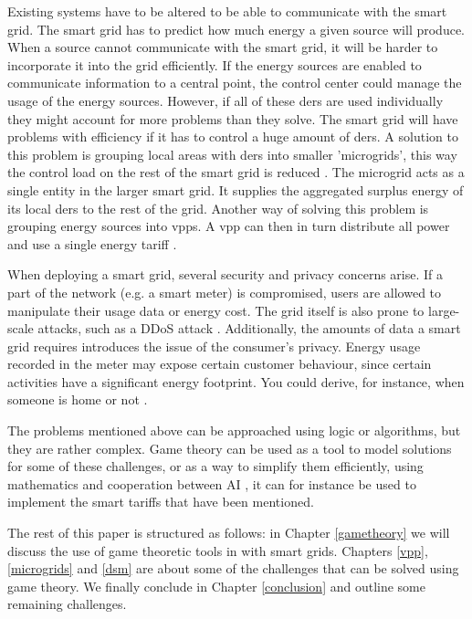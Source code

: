 Existing systems have to be altered to be able to communicate with the smart grid. The smart grid has to predict how much energy a given source will produce. When a source cannot communicate with the smart grid, it will be harder to incorporate it into the grid efficiently. If the energy sources are enabled to communicate information to a central point, the control center could manage the usage of the energy sources. However, if all of these \acp{der} are used individually they might account for more problems than they solve. The smart grid will have problems with efficiency if it has to control a huge amount of \acp{der}. A solution to this problem is grouping local areas with \acp{der} into smaller 'microgrids', this way the control load on the rest of the smart grid is reduced \cite{HatziargyriouAsanoIravaniMarnay2007}. The microgrid acts as a single entity in the larger smart grid. It supplies the aggregated surplus energy of its local \acp{der} to the rest of the grid. Another way of solving this problem is grouping energy sources into \acp{vpp}. A \ac{vpp} can then in turn distribute all power and use a single energy tariff \cite{NikonowiczMilewski2012}.

When deploying a smart grid, several security and privacy concerns arise.  If a part of the network (e.g. a smart meter) is compromised, users are allowed to manipulate their usage data or energy cost. The grid itself is also prone to large-scale attacks, such as a DDoS attack \cite{McDanielMcLaughlin2009a}. Additionally, the amounts of data a smart grid requires introduces the issue of the consumer's privacy. Energy usage recorded in the meter may expose certain customer behaviour, since certain activities have a significant energy footprint. You could derive, for instance, when someone is home or not \cite{Molina-MarkhamShenoyFuEtAl2010}.

The problems mentioned above can be approached using logic or algorithms, but they are rather complex. Game theory can be used as a tool to model solutions for some of these challenges, or as a way to simplify them efficiently, using mathematics and cooperation between AI \cite{myerson2013game}, it can for instance be used to implement the smart tariffs that have been mentioned. 

The rest of this paper is structured as follows: in Chapter \ref{gametheory} we will discuss the use of game theoretic tools in with smart grids. Chapters \ref{vpp}, \ref{microgrids} and \ref{dsm} are about some of the challenges that can be solved using game theory. We finally conclude in Chapter \ref{conclusion} and outline some remaining challenges.